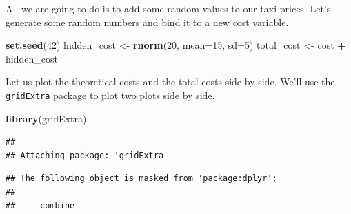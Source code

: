 \documentclass[
]{book}
\newenvironment{Shaded}{\begin{snugshade}}{\end{snugshade}}
\newcommand{\AttributeTok}[1]{\textcolor[rgb]{0.13,0.29,0.53}{#1}}
\newcommand{\DecValTok}[1]{\textcolor[rgb]{0.00,0.00,0.81}{#1}}
\newcommand{\FunctionTok}[1]{\textcolor[rgb]{0.13,0.29,0.53}{\textbf{#1}}}
\newcommand{\NormalTok}[1]{#1}
\newcommand{\OtherTok}[1]{\textcolor[rgb]{0.56,0.35,0.01}{#1}}
\newcommand{\SpecialCharTok}[1]{\textcolor[rgb]{0.81,0.36,0.00}{\textbf{#1}}}
\begin{document}
All we are going to do is to add some random values to our taxi prices. Let's generate some random numbers and bind it to a new cost variable.

\begin{Shaded}
\begin{Highlighting}[]
\FunctionTok{set.seed}\NormalTok{(}\DecValTok{42}\NormalTok{)}
\NormalTok{hidden\_cost }\OtherTok{\textless{}{-}} \FunctionTok{rnorm}\NormalTok{(}\DecValTok{20}\NormalTok{, }\AttributeTok{mean=}\DecValTok{15}\NormalTok{, }\AttributeTok{sd=}\DecValTok{5}\NormalTok{)}
\NormalTok{total\_cost }\OtherTok{\textless{}{-}}\NormalTok{ cost }\SpecialCharTok{+}\NormalTok{ hidden\_cost}
\end{Highlighting}
\end{Shaded}

Let us plot the theoretical costs and the total costs side by side. We'll use the \texttt{gridExtra} package to plot two plots side by side.

\begin{Shaded}
\begin{Highlighting}[]
\FunctionTok{library}\NormalTok{(gridExtra)}
\end{Highlighting}
\end{Shaded}

\begin{verbatim}
## 
## Attaching package: 'gridExtra'
\end{verbatim}

\begin{verbatim}
## The following object is masked from 'package:dplyr':
## 
##     combine
\end{verbatim}
\end{document}
